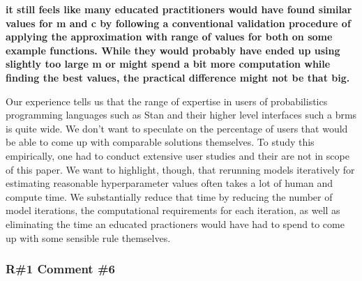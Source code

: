 \documentclass[11pt]{report}
\begin{document}
\textbf{it still feels like many educated practitioners would have found similar values for m and c by following a conventional validation procedure of applying the approximation with range of values for both on some example functions. While they would probably have ended up using slightly too large m or might spend a bit more computation while finding the best values, the practical difference might not be that big.}

Our experience tells us that the range of expertise in users of probabilistics programming languages such as Stan and their higher level interfaces such a brms is quite wide. We don't want to speculate on the percentage of users that would be able to come up with comparable solutions themselves. To study this empirically, one had to conduct extensive user studies and their are not in scope of this paper.
We want to highlight, though, that rerunning models iteratively for estimating reasonable hyperparameter values often takes a lot of human and compute time. We substantially reduce that time by reducing the number of model iterations, the computational requirements for each iteration, as well as eliminating the time an educated practioners would have had to spend to come up with some sensible rule themselves.




\subsubsection*{R\#1 Comment \#6}
\end{document}
